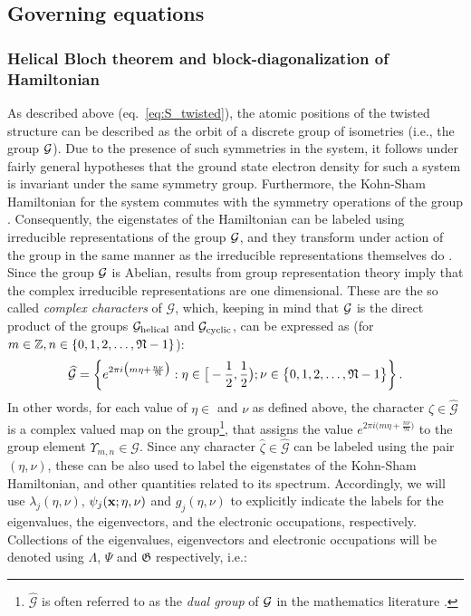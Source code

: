 \documentclass[preprint,12pt, 3p, sort&compress]{elsarticle}
\begin{document}
\subsection{Governing equations}
\label{subsec:gov_eqn}
\subsubsection{Helical Bloch theorem and block-diagonalization of Hamiltonian}
As described above (eq.~\ref{eq:S_twisted}), the atomic positions of the twisted structure can be described as the orbit of a discrete group of isometries (i.e., the group ${\cal G}$). Due to the presence of such symmetries in the system, it follows under fairly general hypotheses \citep{My_PhD_Thesis, banerjee2016cyclic, ghosh2019symmetry, banerjee2021ab} that the ground state electron density for such a system is invariant under the same symmetry group.  Furthermore, the Kohn-Sham Hamiltonian for the system commutes with the symmetry operations of the group  \citep{Hammermesh, McWeeny}. Consequently, the eigenstates of the Hamiltonian can be labeled using irreducible representations of the group ${\cal G}$, and they transform under action of the group in the same manner as the irreducible representations themselves do \citep{My_PhD_Thesis, McWeeny,Hammermesh, banerjee2021ab}. Since the group ${\cal G}$ is Abelian, results from group representation theory\citep{ Folland_Harmonic, Barut_Reps} imply that the complex irreducible representations are one dimensional. These are the so called \textit{complex characters} of $\mathcal{G}$, which, keeping in mind that ${\cal G}$ is the direct product of the groups ${\cal G}_{\text{helical}}$ and ${\cal G}_{\text{cyclic}}$, can be expressed as (for $m \in \mathbb{Z}, n \in\{0,1,2,\ldots,\mathfrak{N} - 1\}$):
\begin{align}
\label{eq:dual_group}
\widehat{\mathcal{G}} =\bigg\{e^{2\pi i \big({m \eta + \frac{n\nu}{ \mathfrak{N}} }\big)}:  \eta \in \big[-\frac{1}{2},\frac{1}{2} \big); \nu \in   \big\{0,1,2,\ldots,\mathfrak{N} - 1\big\} \bigg\}\,.
\end{align}
In other words, for each value of $\eta \in $ and $\nu$ as defined above, the character $\hat{\zeta} \in \widehat{\mathcal{G}}$ is a complex valued map on the group\footnote{ $\widehat{\mathcal{G}}$ is often referred to as the \textit{dual group} of ${\cal G}$ in the mathematics literature \citep{Folland_Harmonic, Barut_Reps}.}, that assigns the value $e^{2\pi i \big({m \eta + \frac{n\nu}{ \mathfrak{N}} }\big)}$ to the group element $\Upsilon_{m,n} \in \mathcal{G} $. Since  any character $\hat{\zeta} \in \widehat{\mathcal{G}}$ can be labeled using the pair $(\eta,\nu)$, these can be also used to label the eigenstates of the Kohn-Sham Hamiltonian, and other quantities related to its spectrum. Accordingly, we will use $\lambda_j(\eta,\nu)$, $\psi_j({\bf x}; \eta,\nu)$ and $g_j(\eta,\nu)$ to explicitly indicate the labels for the eigenvalues, the eigenvectors, and the electronic occupations, respectively. Collections of the eigenvalues, eigenvectors and  electronic occupations will be denoted using $\Lambda$, $\Psi$ and $\mathfrak{G}$ respectively, i.e.:
\end{document}
